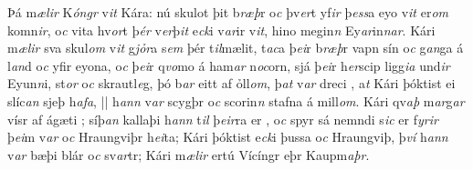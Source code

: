 Þá m\textit{ælir} K\textit{óngr} v\textit{it} Kára:
nú skulot þit b\textit{ræþ}r   
o\textit{c}  þv\textit{er}t   yf\textit{ir} þ\textit{ess}a eyo   v\textit{it} er\textit{om}  komn\textit{ir}, 
o\textit{c} vita hv\textit{or}t þ\textit{ér}
v\textit{er}þ\textit{it} e\textit{ck}i v\textit{ar}ir v\textit{it},    hino  megin\textit{n} Ey\textit{ar}in\textit{n}\textit{ar}.
Kári m\textit{ælir} sva skul\textit{om} v\textit{it} g\textit{jỏr}a s\textit{em} þér t\textit{il}mælit,   t\textit{ac}a þ\textit{ei}r b\textit{ræþ}r vapn sín o\textit{c}
g\textit{an}ga á l\textit{an}d   o\textit{c} yfir eyona, o\textit{c}  þ\textit{ei}r q\textit{vo}mo á ham\textit{ar} n\textit{oc}orn, sjá þ\textit{ei}r   h\textit{er}scip ligg\textit{ia} und\textit{ir} Eyun\textit{n}i,   st\textit{or} o\textit{c} skrautl\textit{e}g, 
þó b\textit{ar}  eitt af ỏll\textit{om}, þ\textit{at} v\textit{ar} dreci  , 
a\textit{t} Kári þóktist ei   slíc\textit{an} sjeþ h\textit{afa}, 
||
h\textit{ann} v\textit{ar}  scygþr   o\textit{c}  scorin\textit{n}   stafna   á mill\textit{om}. 
Kári   qv\textit{aþ} m\textit{ar}g\textit{ar} vísr af ágæti  ; 
síþ\textit{an} kallaþi h\textit{ann} t\textit{il} þ\textit{eir}ra er , 
o\textit{c} spyr   sá nemndi s\textit{ic} er f\textit{yrir} þ\textit{ei}m  v\textit{ar} o\textit{c}  Hraungviþr h\textit{ei}ta; 
Kári þóktist e\textit{ck}i     þussa   o\textit{c}   Hraungviþ, þ\textit{ví} h\textit{ann} v\textit{ar} bæþi blár o\textit{c} sv\textit{ar}tr; Kári m\textit{ælir} ertú Vícíngr eþr Kaupm\textit{aþr}.  
